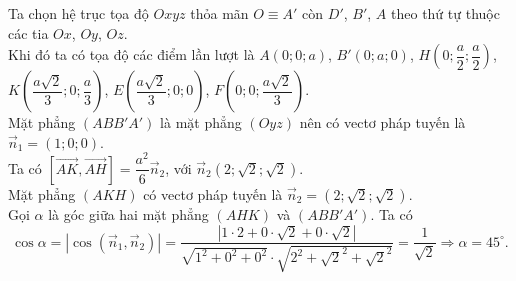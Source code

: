 \begin{ex}
{$$		$$
		Ta chọn hệ trục tọa độ $Oxyz$ thỏa mãn $O \equiv A'$ còn $D'$, $B'$, $A$ theo thứ tự thuộc các tia $Ox$, $Oy$, $Oz$.\\
		Khi đó ta có tọa độ các điểm lần lượt là $A(0;0;a)$, $B'(0;a;0)$, $H\left(0;\dfrac{a}{2};\dfrac{a}{2}\right)$, $K\left(\dfrac{a\sqrt{2}}{3};0;\dfrac{a}{3}\right)$, $E\left(\dfrac{a\sqrt{2}}{3};0;0\right)$, $F\left(0;0;\dfrac{a \sqrt{2}}{3}\right)$.\\
		Mặt phẳng $\left(ABB'A'\right)$ là mặt phẳng $( Oyz)$ nên có vectơ  pháp tuyến là $\vec{n}_1=(1;0;0)$.\\
		Ta có $\left[ \overrightarrow{AK},\overrightarrow{AH}\right] =\dfrac{a^2}{6} \vec{n}_2$, với $\vec{n}_2(2 ; \sqrt{2};\sqrt{2})$.\\
		Mặt phẳng $(AKH)$ có vectơ  pháp tuyến là $\vec{n}_2=(2 ;\sqrt{2};\sqrt{2})$.\\
		Gọi $\alpha$ là góc giữa hai mặt phẳng $(AHK)$ và $\left(ABB'A'\right)$. Ta có 
		$$\cos \alpha=\left|\cos \left(\vec{n}_1, \vec{n}_2\right)\right|= \dfrac{\left| 1\cdot 2+0\cdot \sqrt{2}+0\cdot \sqrt{2}\right| }{\sqrt{1^2+0^2+0^2}\cdot \sqrt{2^2+\sqrt{2}^2+\sqrt{2}^2}}=\dfrac{1}{\sqrt{2}} \Rightarrow \alpha=45^{\circ}.$$
	}
\end{ex}

